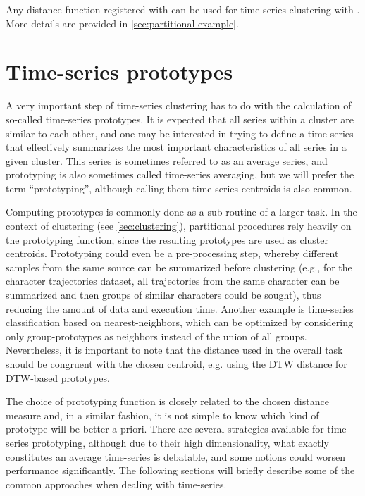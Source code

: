 Any distance function registered with  can be used for time-series clustering with \dtwclust{}.
More details are provided in \cref{sec:partitional-example}.

\section{Time-series prototypes}
\label{sec:prototypes}

A very important step of time-series clustering has to do with the calculation of so-called time-series prototypes.
It is expected that all series within a cluster are similar to each other,
and one may be interested in trying to define a time-series that effectively summarizes the most important characteristics of all series in a given cluster.
This series is sometimes referred to as an average series,
and prototyping is also sometimes called time-series averaging,
but we will prefer the term ``prototyping'',
although calling them time-series centroids is also common.

Computing prototypes is commonly done as a sub-routine of a larger task.
In the context of clustering (see \cref{sec:clustering}),
partitional procedures rely heavily on the prototyping function,
since the resulting prototypes are used as cluster centroids.
Prototyping could even be a pre-processing step,
whereby different samples from the same source can be summarized before clustering
(e.g., for the character trajectories dataset,
all trajectories from the same character can be summarized and then groups of similar characters could be sought),
thus reducing the amount of data and execution time.
Another example is time-series classification based on nearest-neighbors,
which can be optimized by considering only group-prototypes as neighbors instead of the union of all groups.
Nevertheless, it is important to note that the distance used in the overall task should be congruent with the chosen centroid,
e.g. using the DTW distance for DTW-based prototypes.

The choice of prototyping function is closely related to the chosen distance measure and,
in a similar fashion,
it is not simple to know which kind of prototype will be better a priori.
There are several strategies available for time-series prototyping,
although due to their high dimensionality,
what exactly constitutes an average time-series is debatable,
and some notions could worsen performance significantly.
The following sections will briefly describe some of the common approaches when dealing with time-series.

